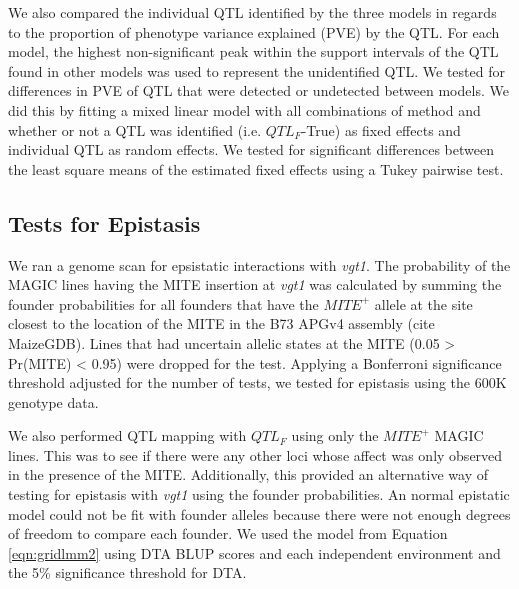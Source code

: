 \documentclass[article,9pt,twocolumn,twoside]{rilabRxiv}
\begin{document}
We also compared the individual QTL identified by the three models in regards to the proportion of phenotype variance explained (PVE) by the QTL.
For each model, the highest non-significant peak within the support intervals of the QTL found in other models was used to represent the unidentified QTL.
We tested for differences in PVE of QTL that were detected or undetected between models. We did this by fitting a mixed linear model with all combinations of method and whether or not a QTL was identified (i.e. $QTL_F$-True) as fixed effects and individual QTL as random effects. We tested for significant differences between the least square means of the estimated fixed effects using a Tukey pairwise test.

\subsection{Tests for Epistasis}
We ran a genome scan for epsistatic interactions with \emph{vgt1}. The probability of the MAGIC lines having the MITE insertion at \emph{vgt1} was calculated by summing the founder probabilities for all founders that have the $MITE^+$ allele at the site closest to the location of the MITE in the B73 APGv4 assembly (cite MaizeGDB).
Lines that had uncertain allelic states at the MITE (0.05 > Pr(MITE) < 0.95) were dropped for the test.
Applying a Bonferroni significance threshold adjusted for the number of tests,
we tested for epistasis using the 600K genotype data.

We also performed QTL mapping with $QTL_F$ using only the $MITE^+$ MAGIC lines.
This was to see if there were any other loci whose affect was only observed in the presence of the MITE.
Additionally, this provided an alternative way of testing for epistasis with \emph{vgt1} using the founder probabilities.
An normal epistatic model could not be fit with founder alleles because there were not enough degrees of freedom to compare each founder.
We used the model from Equation \ref{eqn:gridlmm2} using DTA BLUP scores and each independent environment and the 5\% significance threshold for DTA.
\end{document}
